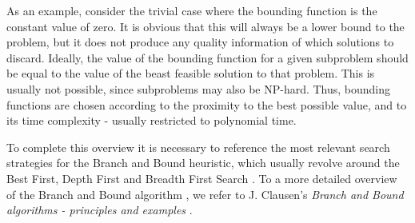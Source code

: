 As an example, consider the trivial case where the bounding function is the constant value of zero. It is obvious that this will always be a lower bound to the problem, but it does not produce any quality information of which solutions to discard. Ideally, the value of the bounding function for a given subproblem should be equal to the value of the beast feasible solution  to that problem. This is usually not possible, since subproblems may also be NP-hard. Thus, bounding functions are chosen according to the proximity to the best possible value, and to its time complexity - usually restricted to polynomial time.

To complete this overview it is necessary to reference the most relevant search strategies for the Branch and Bound heuristic, which usually revolve around the Best First, Depth First and Breadth First Search \cite{bnb}. To a more detailed overview of the Branch and Bound algorithm , we refer to J. Clausen's \textit{Branch and Bound algorithms - principles and examples} \cite{bnb}.